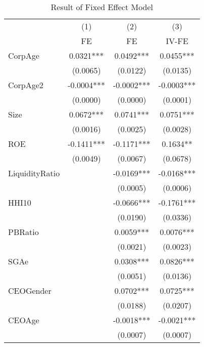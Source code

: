 \begin{table}[htbp]\centering
\def\sym#1{\ifmmode^{#1}\else\(^{#1}\)\fi}
\caption{Result of Fixed Effect Model \label{tab:regressionFE}}
\begin{tabular}{l*{3}{c}}
\hline\hline
            &\multicolumn{1}{c}{(1)}&\multicolumn{1}{c}{(2)}&\multicolumn{1}{c}{(3)}\\
            &\multicolumn{1}{c}{FE}&\multicolumn{1}{c}{FE}&\multicolumn{1}{c}{IV-FE}\\
\hline
CorpAge     &      0.0321***&      0.0492***&      0.0455***\\
            &    (0.0065)   &    (0.0122)   &    (0.0135)   \\
[1em]
CorpAge2    &     -0.0004***&     -0.0002***&     -0.0003***\\
            &    (0.0000)   &    (0.0000)   &    (0.0001)   \\
[1em]
Size        &      0.0672***&      0.0741***&      0.0751***\\
            &    (0.0016)   &    (0.0025)   &    (0.0028)   \\
[1em]
ROE         &     -0.1411***&     -0.1171***&      0.1634** \\
            &    (0.0049)   &    (0.0067)   &    (0.0678)   \\
[1em]
LiquidityRatio&               &     -0.0169***&     -0.0168***\\
            &               &    (0.0005)   &    (0.0006)   \\
[1em]
HHI10       &               &     -0.0666***&     -0.1761***\\
            &               &    (0.0190)   &    (0.0336)   \\
[1em]
PBRatio     &               &      0.0059***&      0.0076***\\
            &               &    (0.0021)   &    (0.0023)   \\
[1em]
SGAe        &               &      0.0308***&      0.0826***\\
            &               &    (0.0051)   &    (0.0136)   \\
[1em]
CEOGender   &               &      0.0702***&      0.0725***\\
            &               &    (0.0188)   &    (0.0207)   \\
[1em]
CEOAge      &               &     -0.0018***&     -0.0021***\\
            &               &    (0.0007)   &    (0.0007)   \\

\end{tabular}
\end{table}
